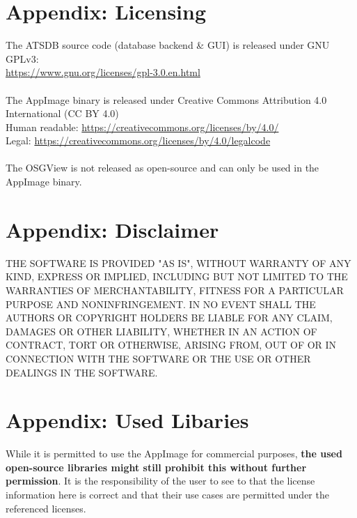 \section{Appendix: Licensing}
\label{sec:appendix_licensing}

The ATSDB source code (database backend \& GUI) is released under GNU GPLv3: \\
\url{https://www.gnu.org/licenses/gpl-3.0.en.html} \\\\

The AppImage binary is released under Creative Commons Attribution 4.0 International (CC BY 4.0) \\
Human readable: \url{https://creativecommons.org/licenses/by/4.0/} \\
Legal: \url{https://creativecommons.org/licenses/by/4.0/legalcode} \\\\

The OSGView is not released as open-source and can only be used in the AppImage binary.

\section{Appendix: Disclaimer}

THE SOFTWARE IS PROVIDED "AS IS", WITHOUT WARRANTY OF ANY KIND, EXPRESS OR IMPLIED, INCLUDING BUT NOT LIMITED TO THE WARRANTIES OF MERCHANTABILITY, FITNESS FOR A PARTICULAR PURPOSE AND NONINFRINGEMENT. IN NO EVENT SHALL THE AUTHORS OR COPYRIGHT HOLDERS BE LIABLE FOR ANY CLAIM, DAMAGES OR OTHER LIABILITY, WHETHER IN AN ACTION OF CONTRACT, TORT OR OTHERWISE, ARISING FROM, OUT OF OR IN CONNECTION WITH THE SOFTWARE OR THE USE OR OTHER DEALINGS IN THE SOFTWARE.

\section{Appendix: Used Libaries}

While it is permitted to use the AppImage for commercial purposes, \textbf{the used open-source libraries might still prohibit this without further permission}. It is the responsibility of the user to see to that the license information here is correct and that their use cases are permitted under the referenced licenses.

